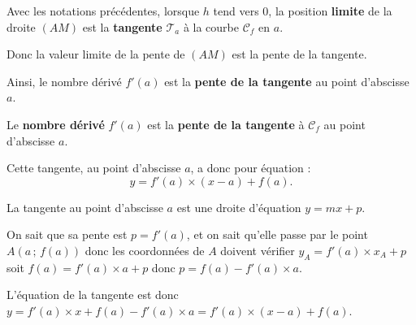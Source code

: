 \documentclass[a4paper,11pt]{article}
\begin{document}
\begin{crmq}
Avec les notations précédentes, lorsque $h$ tend vers 0, la position \textbf{limite} de la droite $(AM)$ est la \textbf{tangente} $\mathscr{T}_a$ à la courbe $\mathscr{C}_f$ en $a$.

Donc la valeur limite de la pente de $(AM)$ est la pente de la tangente.

Ainsi, le nombre dérivé $f'(a)$ est la \textbf{pente de la tangente} au point d'abscisse $a$.
\end{crmq}

\begin{cprop}
Le \textbf{nombre dérivé} $f'(a)$ est la \textbf{pente de la tangente} à $\mathscr{C}_f$ au point d'abscisse $a$.

Cette tangente, au point d'abscisse $a$, a donc pour équation : \[y=f'(a) \times (x-a)+f(a).\] 
\end{cprop}

\begin{cdemoblanc}
La tangente au point d'abscisse $a$ est une droite d'équation $y=mx+p$.

On sait que sa pente est $p=f'(a)$, et on sait qu'elle passe par le point $A(a\,;\,f(a))$ donc les coordonnées de $A$ doivent vérifier $y_A=f'(a) \times x_A+p$ soit $f(a)=f'(a) \times a+p$ donc $p=f(a)-f'(a) \times a$.

L'équation de la tangente est donc $y=f'(a)\times x+f(a)-f'(a) \times a=f'(a) \times (x-a)+f(a)$.
\end{cdemoblanc}
\end{document}

